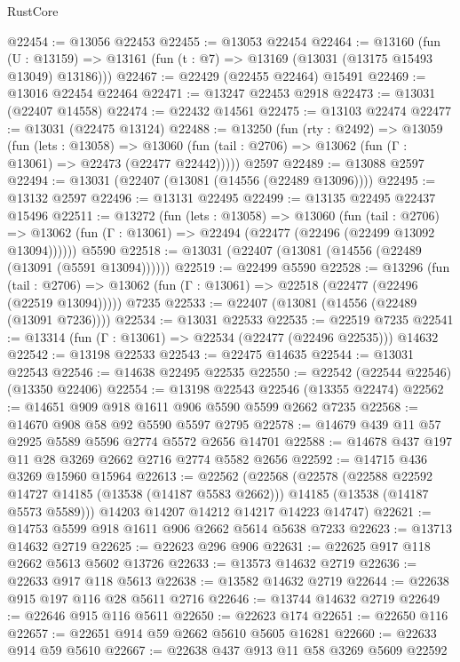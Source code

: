 \begin{lexlean}{RustCore}
\begin{coremodule}
@22454 := @13056 @22453
@22455 := @13053 @22454
@22464 := @13160
    (fun (U : @13159) => @13161 (fun (t : @7) => @13169 (@13031 (@13175 @15493 @13049) @13186)))
@22467 := @22429 (@22455 @22464) @15491
@22469 := @13016 @22454 @22464
@22471 := @13247 @22453 @2918
@22473 := @13031 (@22407 @14558)
@22474 := @22432 @14561
@22475 := @13103 @22474
@22477 := @13031 (@22475 @13124)
@22488 := @13250
    (fun (rty : @2492) =>
    @13059
      (fun (lets : @13058) =>
      @13060 (fun (tail : @2706) => @13062 (fun (Γ : @13061) => @22473 (@22477 @22442)))))
    @2597
@22489 := @13088 @2597
@22494 := @13031 (@22407 (@13081 (@14556 (@22489 @13096))))
@22495 := @13132 @2597
@22496 := @13131 @22495
@22499 := @13135 @22495 @22437 @15496
@22511 := @13272
    (fun (lets : @13058) =>
    @13060
      (fun (tail : @2706) =>
      @13062 (fun (Γ : @13061) => @22494 (@22477 (@22496 (@22499 @13092 @13094))))))
    @5590
@22518 := @13031 (@22407 (@13081 (@14556 (@22489 (@13091 (@5591 @13094))))))
@22519 := @22499 @5590
@22528 := @13296
    (fun (tail : @2706) => @13062 (fun (Γ : @13061) => @22518 (@22477 (@22496 (@22519 @13094)))))
    @7235
@22533 := @22407 (@13081 (@14556 (@22489 (@13091 @7236))))
@22534 := @13031 @22533
@22535 := @22519 @7235
@22541 := @13314 (fun (Γ : @13061) => @22534 (@22477 (@22496 @22535))) @14632
@22542 := @13198 @22533
@22543 := @22475 @14635
@22544 := @13031 @22543
@22546 := @14638 @22495 @22535
@22550 := @22542 (@22544 @22546) (@13350 @22406)
@22554 := @13198 @22543 @22546 (@13355 @22474)
@22562 := @14651 @909 @918 @1611 @906 @5590 @5599 @2662 @7235
@22568 := @14670 @908 @58 @92 @5590 @5597 @2795
@22578 := @14679 @439 @11 @57 @2925 @5589 @5596 @2774 @5572 @2656 @14701
@22588 := @14678 @437 @197 @11 @28 @3269 @2662 @2716 @2774 @5582 @2656
@22592 := @14715 @436 @3269 @15960 @15964
@22613 := @22562
    (@22568
      (@22578
        (@22588 @22592 @14727 @14185 (@13538 (@14187 @5583 @2662)))
        @14185
        (@13538 (@14187 @5573 @5589)))
      @14203
      @14207
      @14212
      @14217
      @14223
      @14747)
@22621 := @14753 @5599 @918 @1611 @906 @2662 @5614 @5638 @7233
@22623 := @13713 @14632 @2719
@22625 := @22623 @296 @906
@22631 := @22625 @917 @118 @2662 @5613 @5602 @13726
@22633 := @13573 @14632 @2719
@22636 := @22633 @917 @118 @5613
@22638 := @13582 @14632 @2719
@22644 := @22638 @915 @197 @116 @28 @5611 @2716
@22646 := @13744 @14632 @2719
@22649 := @22646 @915 @116 @5611
@22650 := @22623 @174
@22651 := @22650 @116
@22657 := @22651 @914 @59 @2662 @5610 @5605 @16281
@22660 := @22633 @914 @59 @5610
@22667 := @22638 @437 @913 @11 @58 @3269 @5609 @22592

\end{coremodule}
\end{lexlean}

